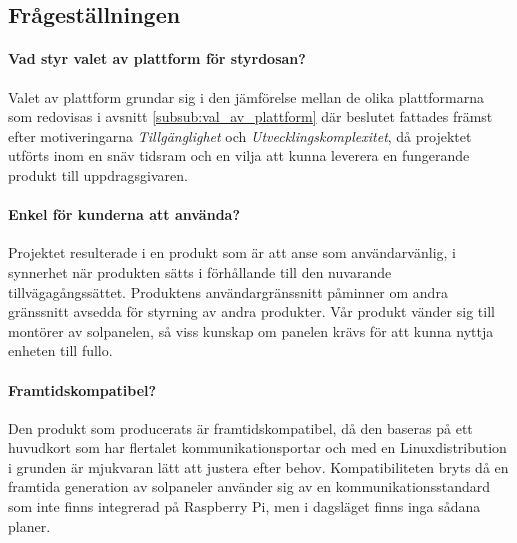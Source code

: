 \documentclass{article}
\begin{document}
        \subsection{Frågeställningen} %
        \label{sub:fragestallningen}
            \paragraph{\textrm{Vad styr valet av plattform för styrdosan?}} %
            \label{par:vad_styr_valet}
                Valet av plattform grundar sig i den jämförelse mellan de olika plattformarna som redovisas i avsnitt \ref{subsub:val_av_plattform} där beslutet fattades främst efter motiveringarna \emph{Tillgänglighet} och \emph{Utvecklingskomplexitet}, då projektet utförts inom en snäv tidsram och en vilja att kunna leverera en fungerande produkt till uppdragsgivaren. 

            \paragraph{\textrm{Enkel för kunderna att använda?}} %
            \label{par:enk}
                Projektet resulterade i en produkt som är att anse som användarvänlig, i synnerhet när produkten sätts i förhållande till den nu\-varande tillväga\-gångs\-sättet. Produktens användar\-gräns\-snitt påminner om andra gränssnitt avsedda för styrning av andra produkter. Vår produkt vänder sig till montörer av solpanelen, så viss kunskap om panelen krävs för att kunna nyttja enheten till fullo.

            \paragraph{\textrm{Framtidskompatibel?}} %
            \label{par:framtidskomaptibel}
                Den produkt som producerats är framtidskompatibel, då den baseras på ett huvudkort som har flertalet kommunikationsportar och med en Linux\-distribution i grunden är mjukvaran lätt att justera efter behov. Kompatibiliteten bryts då en framtida generation av solpaneler använder sig av en kommunikationsstandard som inte finns integrerad på Raspberry Pi, men i dagsläget finns inga sådana planer.
\end{document}
